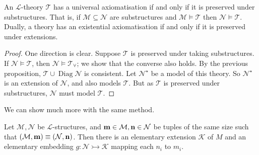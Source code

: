 \begin{corollary}[Tarski, \L{}o\'s]
    An \( \mathcal L \)-theory \( \mathcal T \) has a universal axiomatisation if and only if it is preserved under substructures.
    That is, if \( \mathcal M \subseteq \mathcal N \) are substructures and \( \mathcal M \vDash \mathcal T \) then \( \mathcal N \vDash \mathcal T \).
    Dually, a theory has an existential axiomatisation if and only if it is preserved under extensions.
\end{corollary}
\begin{proof}
    One direction is clear.
    Suppose \( \mathcal T \) is preserved under taking substructures.
    If \( \mathcal N \vDash \mathcal T \), then \( \mathcal N \vDash \mathcal T_\forall \); we show that the converse also holds.
    By the previous proposition, \( \mathcal T \cup \operatorname{Diag} \mathcal N \) is consistent.
    Let \( \mathcal N^\star \) be a model of this theory.
    So \( \mathcal N^\star \) is an extension of \( \mathcal N \), and also models \( \mathcal T \).
    But as \( \mathcal T \) is preserved under substructures, \( \mathcal N \) must model \( \mathcal T \).
\end{proof}
We can show much more with the same method.
\begin{theorem}
    Let \( \mathcal M, \mathcal N \) be \( \mathcal L \)-structures, and \( \vb m \in \mathcal M, \vb n \in \mathcal N \) be tuples of the same size such that \( (\mathcal M, \vb m) \equiv (\mathcal N, \vb n) \).
    Then there is an elementary extension \( \mathcal K \) of \( M \) and an elementary embedding \( g : \mathcal N \rightarrowtail \mathcal K \) mapping each \( n_i \) to \( m_i \).
\end{theorem}
